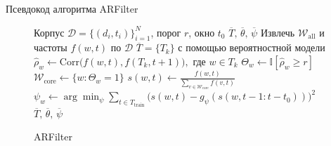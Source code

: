 \documentclass{beamer}
\begin{document}
\begin{frame}{Псевдокод алгоритма ARFilter}
\vspace{-0.4cm}
\begin{figure}[h]
  \centering
  \begin{minipage}{.9\linewidth}
    \begin{algorithm}[H]
      \caption{ARFilter}\label{alg:selection}
      \begin{algorithmic}[1]
        \scriptsize
        \Require Корпус \(\mathcal{D}=\{(d_i,t_i)\}_{i=1}^N\), порог \(r\), окно \(t_0\)
        \Ensure \(\overline{T},\,\overline{\theta},\,\overline{\psi}\)
        \State Извлечь \(\mathcal{W}_{\mathrm{all}}\) и частоты \(f(w,t)\) по $\mathcal{D}$
        \State \(\overline{T}=\{T_k\}\) с помощью вероятностной модели
          \State \(\widehat\rho_w\gets\mathrm{Corr}\bigl(f(w,t),f(T_k,t+1)\bigr),\text{ где } w \in T_k\)
          \State \(\Theta_w\gets\mathbb I[\widehat\rho_w\ge r]\)
        \EndFor
        \State \(\mathcal{W}_{\mathrm{core}}\gets\{w:\Theta_w=1\}\)
          \State \(s(w,t)\gets \frac{f(w,t)}{\sum_{v\in\mathcal{W}_{\mathrm{core}}}f(v,t)}\)
          \State \(\psi_w\gets\arg\min_{\psi}\sum_{t\in T_{\mathrm{train}}}\bigl(s(w,t)-g_{\psi}(s(w,t-1:t-t_0))\bigr)^2\)
        \EndFor
        \State \Return \(\overline{T},\,\overline{\theta},\,\overline{\psi}\)
        \normalsize
      \end{algorithmic}
    \end{algorithm}
  \end{minipage}
\end{figure}

\end{frame}
\end{document}
